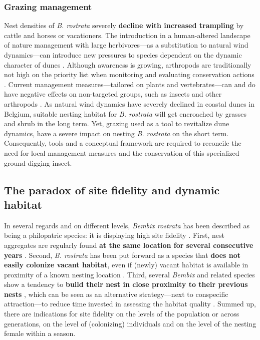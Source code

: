 \documentclass[10pt, twoside]{book} %
\begin{document}
	
	\subsubsection{Grazing management}
	Nest densities of \textit{B. rostrata} severely \textbf{decline with increased trampling} by cattle and horses or vacationers. The introduction in a human-altered landscape of nature management with large herbivores---as a substitution to natural wind dynamics---can introduce new pressures to species dependent on the dynamic character of dunes \citep{bonte2005}. Although awareness is growing, arthropods are traditionally not high on the priority list when monitoring and evaluating conservation actions \citep{clark2002}. Current management measures---tailored on plants and vertebrates---can and do have negative effects on non-targeted groups, such as insects and other arthropods \citep{vanklink2015, vanklink2018}. As natural wind dynamics have severely declined in coastal dunes in Belgium, suitable nesting habitat for \textit{B. rostrata} will get encroached by grasses and shrub in the long term. Yet, grazing used as a tool to revitalize dune dynamics, have a severe impact on nesting \textit{B. rostrata} on the short term. Consequently, tools and a conceptual framework are required to reconcile the need for local management measures and the conservation of this specialized ground-digging insect.\\
	
	\subsection{The paradox of site fidelity and dynamic habitat}\label{introparadox}
	In several regards and on different levels, \textit{Bembix rostrata} has been described as being a philopatric species: it is displaying high site fidelity \citep{nielsen1945, blosch2000, bogusch2021}. First, nest aggregates are regularly found \textbf{at the same location for several consecutive years} \citep{nielsen1945}. Second, \textit{B. rostrata} has been put forward as a species that \textbf{does not easily colonize vacant habitat}, even if (newly) vacant habitat is available in proximity of a known nesting location \citep{nielsen1945, blosch2000, bogusch2021}. Third, several \textit{Bembix} and related species show a tendency to \textbf{build their nest in close proximity to their previous nests} \citep{larsson1989, asis2014}, which can be seen as an alternative strategy---next to conspecific attraction---to reduce time invested in assessing the habitat quality \citep{hoi2012}. Summed up, there are indications for site fidelity on the levels of the population or across generations, on the level of (colonizing) individuals and on the level of the nesting female within a season.\\
	
\end{document}
